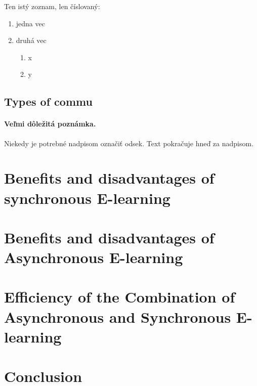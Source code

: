\documentclass[10pt,twoside,english,a4paper]{article}
\begin{document}
Ten istý zoznam, len číslovaný:

\begin{enumerate}
\item jedna vec
\item druhá vec
	\begin{enumerate}
	\item x
	\item y
	\end{enumerate}
\end{enumerate}


\subsection{Types of commu} \label{ina:este}

\paragraph{Veľmi dôležitá poznámka.}
Niekedy je potrebné nadpisom označiť odsek. Text pokračuje hneď za nadpisom.



\section{Benefits and disadvantages of synchronous E-learning} \label{badose}




\section{Benefits and disadvantages of Asynchronous E-learning} \label{badoae}

\section{Efficiency of the Combination of Asynchronous and Synchronous E-learning } \label{comb}


\section{Conclusion} \label{conc} %






\end{document}
